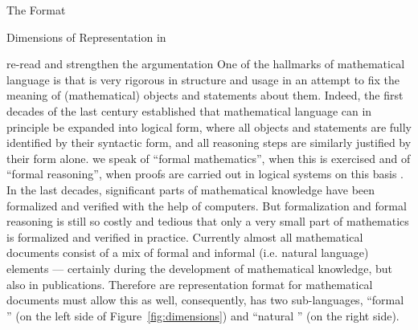 \begin{omgroup}[creators=miko,id=spec-intro]{The \omdoc Format}
\begin{omgroup}[id=syntax-semantics]{Dimensions of Representation in \omdoc}
\begin{newpart}{re-read and strengthen the argumentation}
One of the hallmarks of mathematical language is that is very rigorous in structure and
usage in an attempt to fix the meaning of (mathematical) objects and statements about
them. Indeed, the first decades of the last century established that mathematical language
can in principle be expanded into logical form, where all objects and statements are fully
identified by their syntactic form, and all reasoning steps are similarly justified by
their form alone. we speak of ``formal mathematics'', when this is exercised and of
``formal reasoning'', when proofs are carried out in logical systems on this basis . In
the last decades, significant parts of mathematical knowledge have been formalized and
verified with the help of computers. But formalization and formal reasoning is still so
costly and tedious that only a very small part of mathematics is formalized and verified
in practice. Currently almost all mathematical documents consist of a mix of formal and
informal (i.e. natural language) elements --- certainly during the development of
mathematical knowledge, but also in publications. Therefore are representation format for
mathematical documents must allow this as well, consequently, \omdoc has two
sub-languages, ``formal \omdoc'' (on the left side of Figure~\ref{fig:dimensions}) and
``natural \omdoc'' (on the right side).


\end{newpart}
\end{omgroup}
\end{omgroup}
